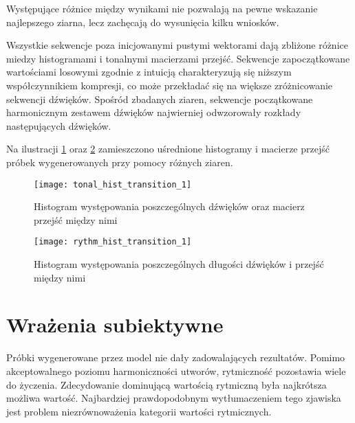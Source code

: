 {{        Występujące różnice między wynikami nie pozwalają na pewne wskazanie najlepszego ziarna, lecz 
        zachęcają do wysunięcia kilku wniosków.

        Wszystkie sekwencje poza inicjowanymi pustymi wektorami dają zbliżone różnice miedzy histogramami i 
        tonalnymi macierzami przejść. 
        Sekwencje zapoczątkowane wartościami losowymi zgodnie z intuicją charakteryzują się niższym współczynnikiem
        kompresji, co może przekładać się na większe zróżnicowanie sekwencji dźwięków.
        Spośród zbadanych ziaren, sekwencje początkowane harmonicznym zestawem dźwięków najwierniej
        odwzorowały rozkłady następujących dźwięków.
        
        Na ilustracji \ref{tonal_hist_transition_1} oraz \ref{rythm_hist_transition_1} zamieszczono uśrednione 
        histogramy i macierze przejść próbek wygenerowanych przy pomocy różnych ziaren.

        \begin{figure}
            \centering
            \texttt{[image: tonal\_hist\_transition\_1]}
            \caption{Histogram występowania poszczególnych dźwięków oraz macierz przejść między nimi}
            \label{tonal_hist_transition_1}
        \end{figure}

        \begin{figure}
            \centering
            \texttt{[image: rythm\_hist\_transition\_1]}
            \caption{Histogram występowania poszczególnych długości dźwięków i przejść między nimi}
            \label{rythm_hist_transition_1}
        \end{figure}
    }

    \section{Wrażenia subiektywne}
    {
        Próbki wygenerowane przez model nie dały zadowalających rezultatów. Pomimo akceptowalnego poziomu 
        harmoniczności utworów, rytmiczność pozostawia wiele do życzenia. Zdecydowanie dominującą wartością 
        rytmiczną była najkrótsza możliwa wartość. Najbardziej prawdopodobnym wytłumaczeniem tego zjawiska jest 
        problem niezrównoważenia kategorii wartości rytmicznych. 

        \bigskip

}}
